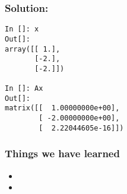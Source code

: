 \documentclass[14pt,compress]{beamer}
\begin{document}
\begin{frame}[fragile]
\frametitle{Solution:}
\begin{lstlisting}
In []: x
Out[]: 
array([[ 1.],
       [-2.],
       [-2.]])

In []: Ax
Out[]: 
matrix([[  1.00000000e+00],
        [ -2.00000000e+00],
        [  2.22044605e-16]])
\end{lstlisting}
\end{frame}

\begin{frame}
  \frametitle{Things we have learned}
  \begin{itemize}
  \item
  \item
  \end{itemize}
\end{frame}
\end{document}

